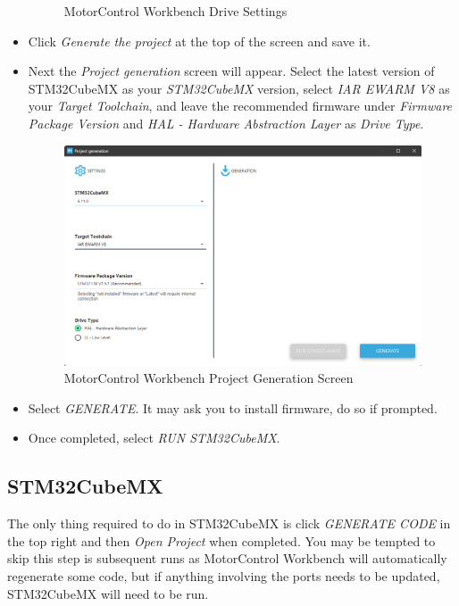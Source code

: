 \documentclass[10pt]{article}
\begin{document}
\begin{itemize}
\begin{figure}[H]
                        \caption{MotorControl Workbench Drive Settings}
                    \end{figure}
                \item Click \emph{Generate the project} at the top of the screen and save it.
                \item Next the \emph{Project generation} screen will appear. Select the latest version of STM32CubeMX as your \emph{STM32CubeMX} version, select \emph{IAR EWARM V8} as your \emph{Target Toolchain}, and leave the recommended firmware under \emph{Firmware Package Version} and \emph{HAL - Hardware Abstraction Layer} as \emph{Drive Type}.
                    \begin{figure}[H]
                        \centerline{\includegraphics[width=\textwidth]{References/MCW Project Gen.png}}
                        \caption{MotorControl Workbench Project Generation Screen}
                    \end{figure}
                \item Select \emph{GENERATE}. It may ask you to install firmware, do so if prompted.
                \item Once completed, select \emph{RUN STM32CubeMX}.
            \end{itemize}
		\FloatBarrier \subsection{STM32CubeMX}
            The only thing required to do in STM32CubeMX is click \emph{GENERATE CODE} in the top right and then \emph{Open Project} when completed. You may be tempted to skip this step is subsequent runs as MotorControl Workbench will automatically regenerate some code, but if anything involving the ports needs to be updated, STM32CubeMX will need to be run.
\end{document}
